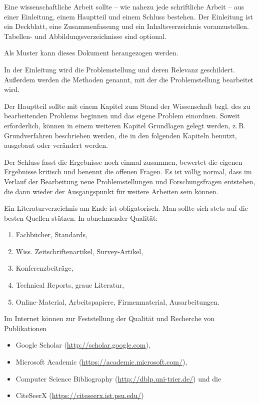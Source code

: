 \documentclass[
    fontsize=12pt,
    headings=small,
    parskip=half,           %
    bibliography=totoc,
    numbers=noenddot,       %
    open=any,               %
    ]{scrreprt}
\begin{document}
Eine wissenschaftliche Arbeit sollte -- wie nahezu jede schriftliche Arbeit -- aus einer Einleitung, einem Hauptteil und einem Schluss bestehen. Der Einleitung ist ein Deckblatt, eine Zusammenfassung und ein Inhaltsverzeichnis voranzustellen. Tabellen- und Abbildungsverzeichnisse sind optional.

Als Muster kann dieses Dokument herangezogen werden.

In der Einleitung wird die Problemstellung und deren Relevanz geschildert. Außerdem werden die Methoden genannt, mit der die Problemstellung bearbeitet wird.

Der Hauptteil sollte mit einem Kapitel zum Stand der Wissenschaft bzgl. des zu bearbeitenden Problems beginnen und das eigene Problem einordnen. Soweit erforderlich, können in einem weiteren Kapitel Grundlagen gelegt werden, z.\,B. Grundverfahren beschrieben werden, die in den folgenden Kapiteln benutzt, ausgebaut oder verändert werden.

Der Schluss fasst die Ergebnisse noch einmal zusammen, bewertet die eigenen Ergebnisse kritisch und benennt die offenen Fragen. Es ist völlig normal, dass im Verlauf der Bearbeitung neue Problemstellungen und Forschungsfragen entstehen, die dann wieder der Ausgangspunkt für weitere Arbeiten sein können.

Ein Literaturverzeichnis am Ende ist obligatorisch. Man sollte sich stets auf die besten Quellen stützen. In abnehmender Qualität:

\begin{enumerate}
	\item Fachbücher, Standards,
	\item Wiss. Zeitschriftenartikel, Survey-Artikel,
	\item Konferenzbeiträge,
	\item Technical Reports, graue Literatur,
	\item Online-Material, Arbeitspapiere, Firmenmaterial, Ausarbeitungen.
\end{enumerate}

Im Internet können zur Feststellung der Qualität und Recherche von Publikationen

\begin{itemize}
	\item Google Scholar (\url{http://scholar.google.com}),
	\item Microsoft Academic (\url{https://academic.microsoft.com/}),
	\item Computer Science Bibliography (\url{http://dblp.uni-trier.de/}) und die
	\item CiteSeerX
		(\url{https://citeseerx.ist.psu.edu/})
\end{itemize}
\end{document}
